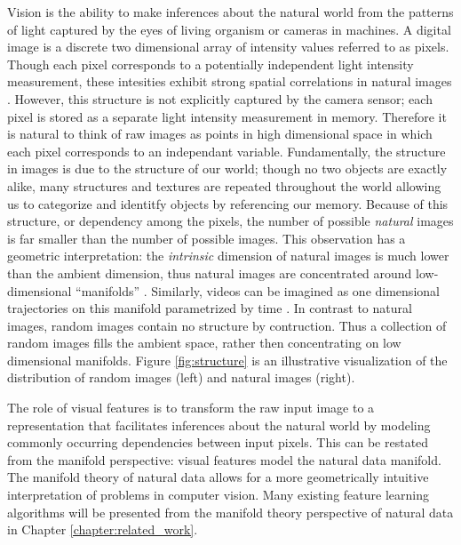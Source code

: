 Vision is the ability to make inferences about the natural world from the
patterns of light captured by the eyes of living organism or cameras in
machines. A digital image is a discrete two dimensional array of intensity
values referred to as pixels. Though each pixel corresponds to a potentially
independent light intensity measurement, these intesities exhibit strong
spatial correlations in natural images \cite{simoncelli2001}.  However, this
structure is not explicitly captured by the camera sensor; each pixel is stored
as a separate light intensity measurement in memory. Therefore it is natural to
think of raw images as points in high dimensional space in which each pixel
corresponds to an independant variable. Fundamentally, the structure in images
is due to the structure of our world; though no two objects are exactly alike,
many structures and textures are repeated throughout the world allowing us to
categorize and identitfy objects by referencing our memory.  Because of this
structure, or dependency among the pixels, the number of possible
\emph{natural} images is far smaller than the number of possible images.  This
observation has a geometric interpretation: the \emph{intrinsic} dimension of
natural images is much lower than the ambient dimension, thus natural images
are concentrated around low-dimensional ``manifolds''
\cite{bengio2013,tenenbaum2000,roweis2000}. Similarly, videos can be imagined
as one dimensional trajectories on this manifold parametrized by time
\cite{goroshin2015}. In contrast to natural images, random images contain no
structure by contruction. Thus a collection of random images fills the ambient
space, rather then concentrating on low dimensional manifolds.  Figure
\ref{fig:structure} is an illustrative visualization of the distribution of
random images (left) and natural images (right). 

The role of visual features is to transform the raw input image to a
representation that facilitates inferences about the natural world by modeling
commonly occurring dependencies between input pixels. This can be restated from
the manifold perspective: visual features model the natural data manifold.  The
manifold theory of natural data allows for a more geometrically intuitive
interpretation of problems in computer vision. Many existing feature learning
algorithms will be presented from the manifold theory perspective of natural
data in Chapter \ref{chapter:related_work}. 

